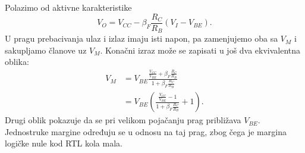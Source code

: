 Polazimo od aktivne karakteristike
\[V_O=V_{CC}-\beta_F\frac{R_C}{R_B}(V_I-V_{BE}).\]
U pragu prebacivanja ulaz i izlaz imaju isti napon, pa zamenjujemo oba sa $V_M$ i sakupljamo članove uz $V_M$. Konačni izraz može se zapisati u još dva ekvivalentna oblika:
\[\begin{aligned}
V_M&=V_{BE}\frac{\frac{V_{CC}}{V_{BE}}+\beta_F\frac{R_C}{R_B}}{1+\beta_F\frac{R_C}{R_B}}\\
&=V_{BE}\left(\frac{\frac{V_{CC}}{V_{BE}}-1}{1+\beta_F\frac{R_C}{R_B}}+1\right).
\end{aligned}\]
Drugi oblik pokazuje da se pri velikom pojačanju prag približava $V_{BE}$. Jednostruke margine određuju se u odnosu na taj prag, zbog čega je margina logičke nule kod RTL kola mala.
